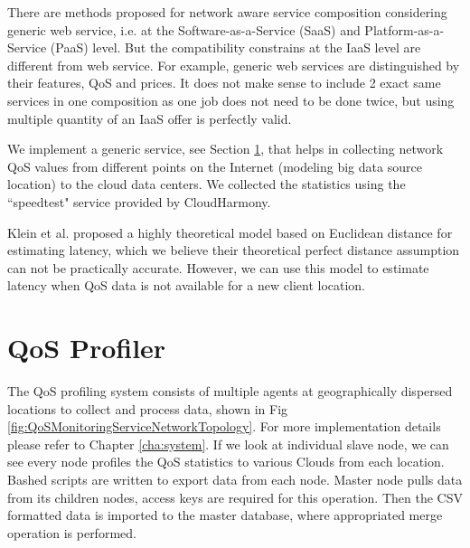 There are methods proposed for network aware service composition    \cite{yu2007efficient}   \cite{zeng2004qos} \cite{zheng2013qos} considering generic web service, i.e. at the Software-as-a-Service (SaaS) and Platform-as-a-Service (PaaS) level. But the compatibility constrains at the IaaS level are different from web service. For example, generic web services are distinguished by their features, QoS and prices. It does not make sense to include 2 exact same services in one composition as one job does not need to be done twice, but using multiple quantity of an IaaS offer is perfectly valid.

We implement a generic service, see Section \ref{sec:QoSProfilerDesign}, that helps in collecting network QoS values from different points on the Internet (modeling big data source location) to the cloud data centers.
We collected the statistics using the ``speedtest"  service provided by CloudHarmony.

Klein et al. \cite{klein2012towards} proposed a highly theoretical model based on Euclidean distance for estimating latency, which we believe their theoretical perfect distance assumption can not be practically accurate. However, we can use this model to estimate latency when QoS data is not available for a new client location.

\section{QoS Profiler}
\label{sec:QoSProfilerDesign}
The QoS profiling system consists of multiple agents at geographically dispersed locations to collect and process data, shown in Fig \ref{fig:QoSMonitoringServiceNetworkTopology}.
For more implementation details please refer to Chapter \ref{cha:system}.
If we look at individual slave node, we can see every node profiles the QoS statistics to various Clouds from each location. Bashed scripts are written to export data from each node. Master node pulls data from its children nodes, access keys are required for this operation. Then the CSV formatted data is imported to the master database, where appropriated merge operation is performed.

